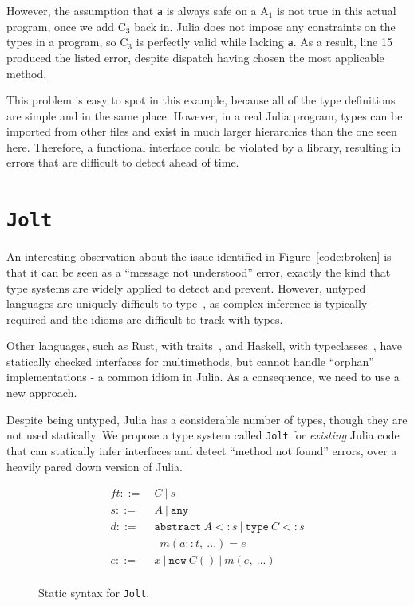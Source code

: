 \documentclass[preprint]{sigplanconf}
\newcommand{\xt}[1]{\texttt{#1}}
\newcommand{\abstype}[2]{\xt{abstract}~#1 <: #2}
\newcommand{\oftype}[2]{#1::#2}
\newcommand{\m}[2]{{#1}(#2)}
\newcommand{\contype}[2]{\xt{type}~#1 <: #2}
\newcommand{\any}{\xt{any}}
\newcommand{\jolt}{\xt{Jolt}}
\renewcommand{\ldots}{...}
\newcommand{\cnum}[2]{$\text{#1}_#2$}
\begin{document}
However, the assumption that \xt{a} is always safe on a \cnum{A}{1} is not true
in this actual program, once we add \cnum{C}{3} back in. Julia does not impose
any constraints on the types in a program, so \cnum{C}{3} is perfectly valid
while lacking \xt{a}. As a result, line 15 produced the listed error, despite 
dispatch having chosen the most applicable method.

This problem is easy to spot in this example, because all of the type definitions
are simple and in the same place. However, in a real Julia program, types can be
imported from other files and exist in much larger hierarchies than the one seen
here. Therefore, a functional interface could be violated by a library, resulting in
errors that are difficult to detect ahead of time.

\section{\jolt}
An interesting observation about the issue identified in Figure~\ref{code:broken}
is that it can be seen as a ``message not understood'' error, exactly the kind
that type systems are widely applied to detect and prevent. However, untyped 
languages are uniquely difficult to type~\cite{cannonpython}, as complex inference is typically
required and the idioms are difficult to track with types.

Other languages, such as Rust, with traits~\cite{rust}, and Haskell, with 
typeclasses~\cite{typeclasses}, have statically checked interfaces for multimethods, but 
cannot handle ``orphan'' implementations - a common idiom in Julia. As a 
consequence, we need to use a new approach.

Despite being untyped, Julia has a considerable
number of types, though they are not used statically. We propose a type system called \jolt\space
for \emph{existing} Julia code that can statically infer interfaces and detect
``method not found'' errors, over a heavily pared down version of Julia.

\begin{figure}
\begin{align*}f
t ::=~&  C ~|~ s\\
s ::=~& A ~|~ \any\\
d ::=~& \abstype{A}{s} ~|~ \contype{C}{s} \\
  & |~ \m{m}{\oftype{a}{t}, ~\ldots} = e\\
e ::=~& x ~|~ \xt{new} ~ C() ~|~ m(e,~\ldots) \\
\end{align*}
\caption{Static syntax for \jolt.}
\label{fm:syntax}
\end{figure}
\end{document}
